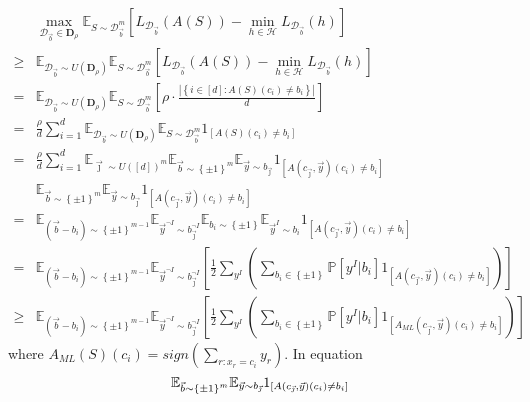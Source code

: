 \begin{align*}
    &\max_{\mathcal{D}_{\vec{b}} \in \mathbf{D}_\rho} \mathbb{E}_{S \sim \mathcal{D}^m_{\vec{b}}} \left[ L_{\mathcal{D}_{\vec{b}}}(A(S)) - \min_{h \in \mathcal{H}} L_{\mathcal{D}_{\vec{b}}}(h) \right]\\
    \ge& \mathbb{E}_{\mathcal{D}_{\vec{b}} \sim U(\mathbf{D}_\rho)} \mathbb{E}_{S \sim \mathcal{D}^m_{\vec{b}}} \left[ L_{\mathcal{D}_{\vec{b}}}(A(S)) - \min_{h \in \mathcal{H}} L_{\mathcal{D}_{\vec{b}}}(h) \right]\\
    =& \mathbb{E}_{\mathcal{D}_{\vec{b}} \sim U(\mathbf{D}_\rho)} \mathbb{E}_{S \sim \mathcal{D}^m_{\vec{b}}} \left[ \rho \cdot \frac{\left| \left\{ i \in [d]: A(S)(c_i) \ne b_i \right\} \right|}{d} \right]\\
    =& \frac{\rho}{d} \sum^{d}_{i=1} \mathbb{E}_{\mathcal{D}_{\vec{b}} \sim U(\mathbf{D}_\rho)} \mathbb{E}_{S \sim \mathcal{D}^m_{\vec{b}}} 1_{[A(S)(c_i) \ne b_i]}\\
    =& \frac{\rho}{d} \sum^{d}_{i=1} \mathbb{E}_{\vec\jmath \sim {U([d])}^m} \mathbb{E}_{\vec{b} \sim {\left\{ \pm 1 \right\}}^m} \mathbb{E}_{\vec{y} \sim b_{\vec\jmath}} 1_{[A(c_{\vec\jmath}, \vec{y})(c_i) \ne b_i]}\\
    &\mathbb{E}_{\vec{b} \sim {\left\{ \pm 1 \right\}}^m} \mathbb{E}_{\vec{y} \sim b_{\vec\jmath}} 1_{[A(c_{\vec\jmath}, \vec{y})(c_i) \ne b_i]}\\
    =& \mathbb{E}_{(\vec{b}-b_i) \sim {\left\{ \pm 1 \right\}}^{m-1}} \mathbb{E}_{\vec{y}^{\neg I} \sim b^{\neg I}_{\vec\jmath}} \mathbb{E}_{b_i \sim \left\{ \pm 1 \right\}} \mathbb{E}_{\vec{y}^I \sim b_i} 1_{[A(c_{\vec\jmath}, \vec{y})(c_i) \ne b_i]}\\
    =& \mathbb{E}_{(\vec{b}-b_i) \sim {\left\{ \pm 1 \right\}}^{m-1}} \mathbb{E}_{\vec{y}^{\neg I} \sim b^{\neg I}_{\vec\jmath}} \left[ \frac{1}{2} \sum^{}_{y^I} \left( \sum^{}_{b_i \in \left\{ \pm 1 \right\}} \mathbb{P}[y^I | b_i] 1_{[A(c_{\vec{\jmath}}, \vec{y})(c_i) \ne b_i]} \right) \right]\\
    \ge& \mathbb{E}_{(\vec{b}-b_i) \sim {\left\{ \pm 1 \right\}}^{m-1}} \mathbb{E}_{\vec{y}^{\neg I} \sim b^{\neg I}_{\vec\jmath}} \left[ \frac{1}{2} \sum^{}_{y^I} \left( \sum^{}_{b_i \in \left\{ \pm 1 \right\}} \mathbb{P}[y^I | b_i] 1_{[A_{ML}(c_{\vec{\jmath}}, \vec{y})(c_i) \ne b_i]} \right) \right]
\end{align*}
where $ A_{ML}(S) (c_i) = sign \left( \sum^{}_{r: x_r = c_i} y_r \right) $.
In equation
\[
    \mathbb{E}_{\vec{b} \sim {\left\{ \pm 1 \right\}}^m} \mathbb{E}_{\vec{y} \sim b_{\vec\jmath}} 1_{[A(c_{\vec\jmath}, \vec{y})(c_i) \ne b_i]}\\
\]
